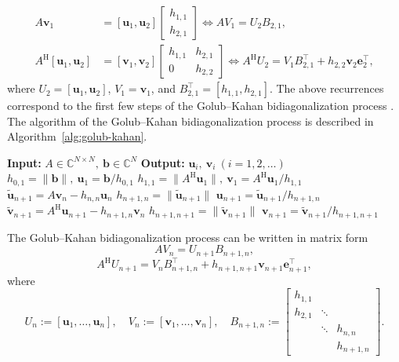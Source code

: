 \[\begin{aligned}A\bm v_1&=[\bm u_1,\bm u_2]\begin{bmatrix}h_{1,1}\\h_{2,1}\end{bmatrix}\Leftrightarrow AV_1=U_2B_{2,1},\\
A^{\mathrm H}[\bm u_1,\bm u_2]&=[\bm v_1,\bm v_2]\begin{bmatrix}h_{1,1}&h_{2,1}\\0&h_{2,2}\end{bmatrix}\Leftrightarrow A^{\mathrm H}U_2=V_1B_{2,1}^{\top}+h_{2,2}\bm v_2\bm e_2^{\top},\end{aligned}\]
{where $U_2=[\bm u_1,\bm u_2]$, $V_1=\bm v_1$, and $B_{2,1}^{\top}=[h_{1,1},h_{2,1}]$. The above recurrences correspond to the first few steps of the Golub--Kahan bidiagonalization process . The algorithm of the Golub--Kahan bidiagonalization process is described in Algorithm\ \ref{alg:golub-kahan}.}
\begin{algorithm}[H]\caption{{The Golub--Kahan bidiagonalization process}}\label{alg:golub-kahan}\begin{algorithmic}[1]
\Statex\textbf{Input:} $A\in\mathbb C^{N\times N},\ \bm b\in\mathbb C^N$
\Statex\textbf{Output:} $\bm u_i,\ \bm v_i\ (i=1,2,\ldots)$
\State $h_{0,1}=\|\bm b\|,\ \bm u_1=\bm b/h_{0,1}$
\State $h_{1,1}=\|A^{\mathrm H}\bm u_1\|,\ \bm v_1=A^{\mathrm H}\bm u_1/h_{1,1}$
\State $\widetilde{\bm u}_{n+1}=A\bm v_n-h_{n,n}\bm u_n$
\State $h_{n+1,n}=\|\widetilde{\bm u}_{n+1}\|$
\State $\bm u_{n+1}=\widetilde{\bm u}_{n+1}/h_{n+1,n}$
\State $\widetilde{\bm v}_{n+1}=A^{\mathrm H}\bm u_{n+1}-h_{n+1,n}\bm v_n$
\State $h_{n+1,n+1}=\|\widetilde{\bm v}_{n+1}\|$
\State $\bm v_{n+1}=\widetilde{\bm v}_{n+1}/h_{n+1,n+1}$
\EndFor\end{algorithmic}\end{algorithm}
{The Golub--Kahan bidiagonalization process can be written in matrix form}
\begin{equation}\label{eq:golub-kahan-matrix-forward}AV_n=U_{n+1}B_{n+1,n},\end{equation}
\[A^{\mathrm H}U_{n+1}=V_nB_{n+1,n}^{\top}+h_{n+1,n+1}\bm v_{n+1}\bm e_{n+1}^{\top},\]
{where}
\[U_n:=[\bm u_1,\ldots,\bm u_n],\quad V_n:=[\bm v_1,\ldots,\bm v_n],\quad B_{n+1,n}:=\begin{bmatrix}h_{1,1}&&\\h_{2,1}&\ddots&\\&\ddots&h_{n,n}\\&&h_{n+1,n}\end{bmatrix}.\]
